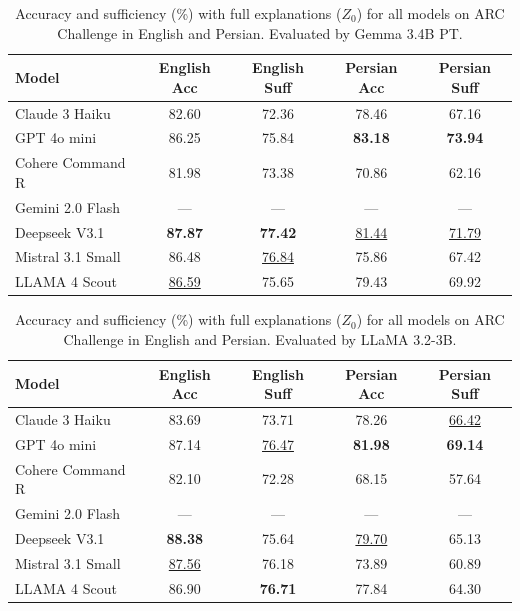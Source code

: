 
\begin{table}[t]
\centering
\caption{Accuracy and sufficiency (\%) with full explanations ($Z_0$) for all models on ARC Challenge in English and Persian. Evaluated by Gemma 3.4B PT.}
\label{tab:overall-z0-gemma-3.4b-pt}
\begin{tabular}{lcccc}
\toprule
\textbf{Model} & \textbf{English Acc} & \textbf{English Suff} & \textbf{Persian Acc} & \textbf{Persian Suff} \\
\midrule
Claude 3 Haiku & 82.60 & 72.36 & 78.46 & 67.16 \\
GPT 4o mini & 86.25 & 75.84 & \textbf{83.18} & \textbf{73.94} \\
Cohere Command R & 81.98 & 73.38 & 70.86 & 62.16 \\
Gemini 2.0 Flash & --- & --- & --- & --- \\
Deepseek V3.1 & \textbf{87.87} & \textbf{77.42} & \underline{81.44} & \underline{71.79} \\
Mistral 3.1 Small & 86.48 & \underline{76.84} & 75.86 & 67.42 \\
LLAMA 4 Scout & \underline{86.59} & 75.65 & 79.43 & 69.92 \\
\bottomrule
\end{tabular}
\end{table}

\begin{table}[t]
\centering
\caption{Accuracy and sufficiency (\%) with full explanations ($Z_0$) for all models on ARC Challenge in English and Persian. Evaluated by LLaMA 3.2-3B.}
\label{tab:overall-z0-llama-3.2-3b}
\begin{tabular}{lcccc}
\toprule
\textbf{Model} & \textbf{English Acc} & \textbf{English Suff} & \textbf{Persian Acc} & \textbf{Persian Suff} \\
\midrule
Claude 3 Haiku & 83.69 & 73.71 & 78.26 & \underline{66.42} \\
GPT 4o mini & 87.14 & \underline{76.47} & \textbf{81.98} & \textbf{69.14} \\
Cohere Command R & 82.10 & 72.28 & 68.15 & 57.64 \\
Gemini 2.0 Flash & --- & --- & --- & --- \\
Deepseek V3.1 & \textbf{88.38} & 75.64 & \underline{79.70} & 65.13 \\
Mistral 3.1 Small & \underline{87.56} & 76.18 & 73.89 & 60.89 \\
LLAMA 4 Scout & 86.90 & \textbf{76.71} & 77.84 & 64.30 \\
\bottomrule
\end{tabular}
\end{table}

